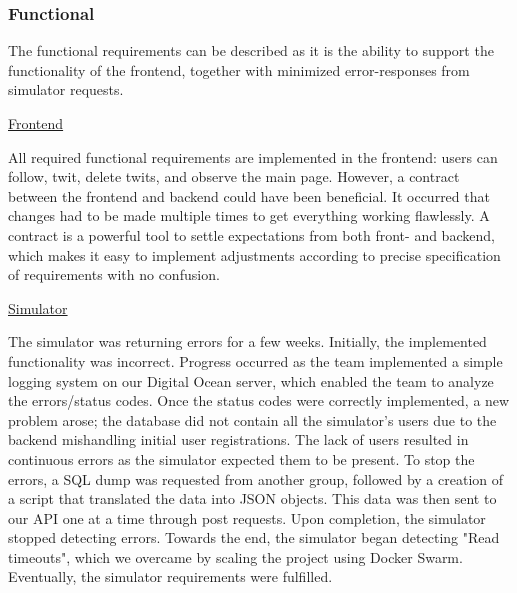\subsubsection*{Functional}

The functional requirements can be described as it is the ability to support the functionality of the frontend, together with minimized error-responses from simulator requests.
\vspace{3mm}

\underline{Frontend}

All required functional requirements are implemented in the frontend: users can follow, twit, delete twits, and observe the main page. However, a contract between the frontend and backend could have been beneficial. It occurred that changes had to be made multiple times to get everything working flawlessly. A contract is a powerful tool to settle expectations from both front- and backend, which makes it easy to implement adjustments according to precise specification of requirements with no confusion.
\vspace{3mm}

\underline{Simulator}

The simulator was returning errors for a few weeks. Initially, the implemented functionality was incorrect. Progress occurred as the team implemented a simple logging system on our Digital Ocean server, which enabled the team  to analyze the errors/status codes. Once the status codes were correctly implemented, a new problem arose; the database did not contain all the simulator's users due to the backend mishandling initial user registrations. The lack of users resulted in continuous errors as the simulator expected them to be present. To stop the errors, a SQL dump was requested from another group, followed by a creation of a script that translated the data into JSON objects. This data was then sent to our API one at a time through post requests. Upon completion, the simulator stopped detecting errors. Towards the end, the simulator began detecting "Read timeouts", which we overcame by scaling the project using Docker Swarm. Eventually, the simulator requirements were fulfilled.